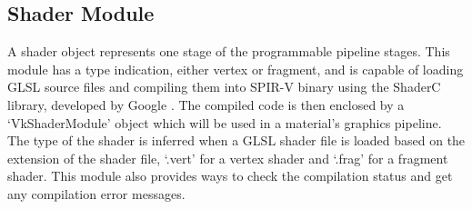 \subsection{Shader Module}
A shader object represents one stage of the programmable pipeline stages. This module has a type indication, either vertex or fragment, and is capable of loading GLSL source files and compiling them into SPIR-V binary using the ShaderC library, developed by Google \cite{shaderc_repo}. The compiled code is then enclosed by a `VkShaderModule' object which will be used in a material's graphics pipeline. The type of the shader is inferred when a GLSL shader file is loaded based on the extension of the shader file, `.vert' for a vertex shader and `.frag' for a fragment shader. This module also provides ways to check the compilation status and get any compilation error messages.
